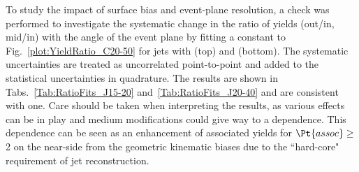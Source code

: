 To study the impact of surface bias and event-plane resolution, a check was performed to investigate the systematic change in the ratio of yields (out/in, mid/in) with the angle of the event plane by fitting a constant to Fig.~\ref{plot:YieldRatio_C20-50} for jets with  (top) and  (bottom).  The systematic uncertainties are treated as uncorrelated point-to-point and added to the statistical uncertainties in quadrature.  The results are shown in Tabs.~\ref{Tab:RatioFits_J15-20} and~\ref{Tab:RatioFits_J20-40} and are consistent with one.  Care should be taken when interpreting the results, as various effects can be in play and medium modifications could give way to a  dependence. This  dependence can be seen as an enhancement of associated yields for $\Pt{assoc} \geq$ 2 \GeVc on the near-side from the geometric kinematic biases due to the ``hard-core" requirement of jet reconstruction.   

